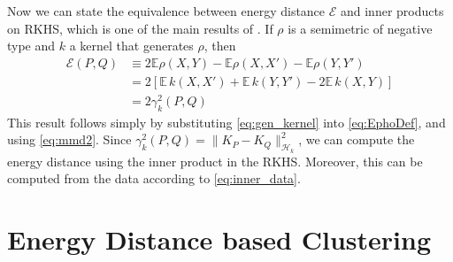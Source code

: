 \documentclass{article}
\def\Energy{\mathcal{E}}
\def\E{\mathbb{E}}
\begin{document}
Now we can state the equivalence between energy distance $\Energy$ and
inner products on RKHS, which is one of the main results of
\cite{Sejdinovic2013}. If $\rho$ is a semimetric
of negative type and $k$ a kernel that generates $\rho$, then
\begin{align}
\Energy(P, Q) &\equiv 2\E \rho(X,Y) - \E \rho(X,X') - \E \rho(Y,Y') 
\label{eq:EphoDef}\\
&= 2 \left[ \E \, k(X, X') + \E \, k(Y, Y') - 2\E \, k(X, Y)\right] \\
&=2 \gamma_k^2(P,Q) 
\end{align}
This result follows simply by substituting \eqref{eq:gen_kernel} into
\eqref{eq:EphoDef}, and using \eqref{eq:mmd2}.
Since $\gamma_k^2(P, Q) = \| K_P - K_Q \|^2_{\mathcal{H}_k}$, we
can compute the energy distance using the inner product in the RKHS. Moreover,
this can be computed from the data according to \eqref{eq:inner_data}.


\section{Energy Distance based Clustering}
\end{document}
